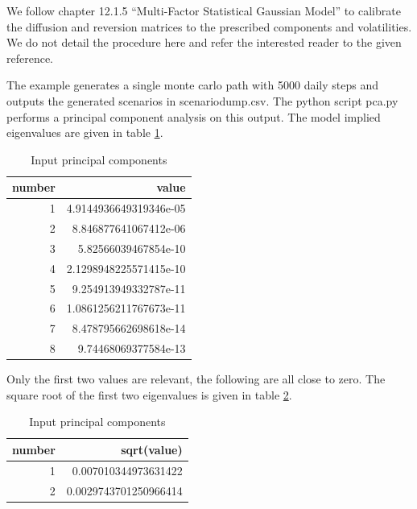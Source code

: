 \documentclass[12pt, a4paper]{article}
\begin{document}
We follow \cite{Andersen_Piterbarg_2010} chapter 12.1.5 ``Multi-Factor Statistical Gaussian Model'' to calibrate the
diffusion and reversion matrices to the prescribed components and volatilities. We do not detail the procedure here and
refer the interested reader to the given reference.

The example generates a single monte carlo path with 5000 daily steps and outputs the generated scenarios in
scenariodump.csv. The python script pca.py performs a principal component analysis on this output. The model implied
eigenvalues are given in table \ref{tab:ex37_2}.

\begin{table}[hbt]
\begin{center}
\begin{tabular}{r|r}
number & value                  \\
\hline      
1      & 4.9144936649319346e-05 \\
2      & 8.846877641067412e-06  \\
3      & 5.82566039467854e-10   \\
4      & 2.1298948225571415e-10 \\
5      & 9.254913949332787e-11  \\
6      & 1.0861256211767673e-11 \\
7      & 8.478795662698618e-14  \\
8      & 9.74468069377584e-13   \\
\end{tabular}
\caption{Input principal components}
\label{tab:ex37_2}
\end{center}
\end{table}

Only the first two values are relevant, the following are all close to zero. The square root of the first two
eigenvalues is given in table \ref{tab:ex37_3}.

\begin{table}[hbt]
\begin{center}
\begin{tabular}{r|r}
number & sqrt(value)                \\
\hline      
1      & 0.007010344973631422       \\
2      & 0.0029743701250966414      \\
\end{tabular}
\caption{Input principal components}
\label{tab:ex37_3}
\end{center}
\end{table}
\end{document}
